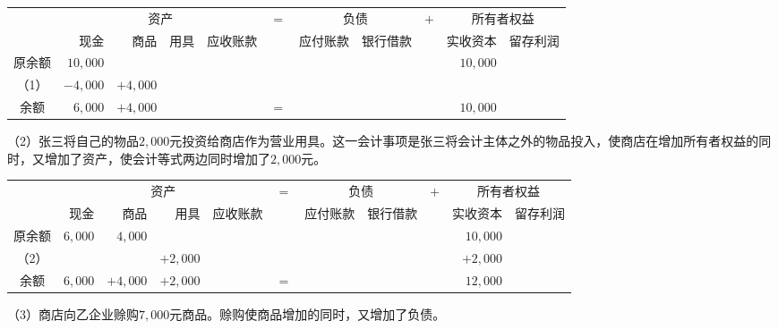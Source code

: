 		\begin{table}[h!]
			\small
			\centering
			\begin{tabular}{c*{10}{r}}
							 & \multicolumn{4}{c}{资产}& \multirow{2}{*}{$=$} & \multicolumn{2}{c}{负债} & \multirow{2}{*}{$+$} & \multicolumn{2}{c}{所有者权益} \\
				\cline{2-5} \cline{7-8} \cline{10-11}
							 & 现金 & 商品 & 用具 & 应收账款 & & 应付账款 & 银行借款 & & 实收资本 & 留存利润 \\ 
				原余额 & $10,000$ & \multicolumn{7}{c}{} & $10,000$ &  \\
				（1）  & $-4,000$ & $+4,000$ \\
				\cline{2-5} \cline{7-8} \cline{10-11}
				余额   & $6,000$ & $+4,000$ & \multicolumn{2}{c}{} & $=$ & \multicolumn{3}{c}{} & $10,000$ & \\
			\end{tabular}
		\end{table}

		（2）张三将自己的物品$2,000$元投资给商店作为营业用具。这一会计事项是张三将会计主体之外的物品投入，使商店在增加所有者权益的同时，又增加了资产，使会计等式两边同时增加了$2,000$元。

		\begin{table}[!ht]
			\small
			\centering
			\begin{tabular}{c*{10}{r}}
							 & \multicolumn{4}{c}{资产}& \multirow{2}{*}{$=$} & \multicolumn{2}{c}{负债} & \multirow{2}{*}{$+$} & \multicolumn{2}{c}{所有者权益} \\
				\cline{2-5} \cline{7-8} \cline{10-11}
							 & 现金 & 商品 & 用具 & 应收账款 & & 应付账款 & 银行借款 & & 实收资本 & 留存利润 \\ 
				原余额 & $6,000$ & $4,000$ & \multicolumn{6}{c}{} & $10,000$  \\
				（2） & \multicolumn{2}{c}{} & $+2,000$ & \multicolumn{5}{c}{} & $+2,000$  \\
				\cline{2-5} \cline{7-8} \cline{10-11}
				余额   & $6,000$ & $+4,000$ & $+2,000$ & & $=$ & \multicolumn{3}{c}{} & $12,000$   \\
			\end{tabular}
		\end{table}

		（3）商店向乙企业赊购$7,000$元商品。赊购使商品增加的同时，又增加了负债。

